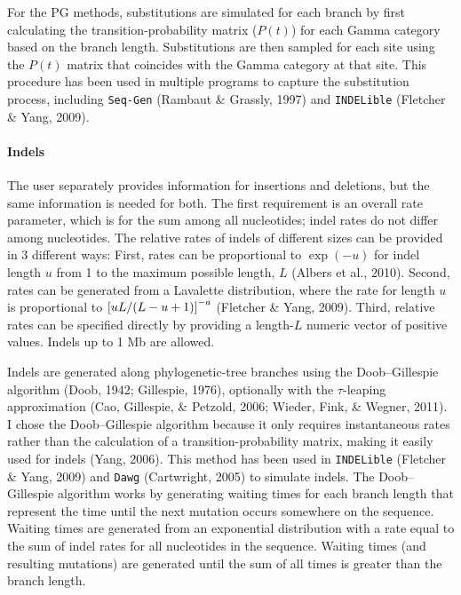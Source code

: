 \documentclass[12pt,]{article}
\let\oldparagraph\paragraph
\renewcommand{\paragraph}[1]{\oldparagraph{#1}\mbox{}}
\let\originalleft\left
\let\originalright\right
\renewcommand{\left}{\mathopen{}\mathclose\bgroup\originalleft}
\renewcommand{\right}{\aftergroup\egroup\originalright}
\begin{document}
For the PG methods, substitutions are simulated for each branch by first
calculating the transition-probability matrix (\(P(t)\)) for each Gamma category based on
the branch length.
Substitutions are then sampled for each site using the \(P(t)\) matrix that coincides with
the Gamma category at that site.
This procedure has been used in multiple programs to capture the substitution process,
including \texttt{Seq-Gen} (Rambaut \& Grassly, 1997) and \texttt{INDELible} (Fletcher \& Yang, 2009).

\hypertarget{indels}{%
\paragraph{Indels}\label{indels}}

The user separately provides information for insertions and deletions, but
the same information is needed for both.
The first requirement is an overall rate parameter, which is for the sum among all
nucleotides; indel rates do not differ among nucleotides.
The relative rates of indels of different sizes can be provided in 3 different ways:
First, rates can be proportional to \(\exp(-u)\) for indel length \(u\) from
1 to the maximum possible length, \(L\) (Albers et al., 2010).
Second, rates can be generated from a Lavalette distribution,
where the rate for length \(u\) is proportional to
\(\left[{u L / (L - u + 1)}\right]^{-a}\) (Fletcher \& Yang, 2009).
Third, relative rates can be specified directly by providing a length-\(L\)
numeric vector of positive values.
Indels up to 1 Mb are allowed.

Indels are generated along phylogenetic-tree branches using
the Doob--Gillespie algorithm (Doob, 1942; Gillespie, 1976), optionally
with the \(\tau\)-leaping approximation (Cao, Gillespie, \& Petzold, 2006; Wieder, Fink, \& Wegner, 2011).
I chose the Doob--Gillespie algorithm because it only requires instantaneous rates
rather than the calculation of a transition-probability matrix, making it easily used
for indels (Yang, 2006).
This method has been used in \texttt{INDELible} (Fletcher \& Yang, 2009) and \texttt{Dawg} (Cartwright, 2005)
to simulate indels.
The Doob--Gillespie algorithm works by generating waiting times for each branch
length that represent the time until the next mutation occurs somewhere on the sequence.
Waiting times are generated from an exponential distribution with a rate equal to the
sum of indel rates for all nucleotides in the sequence.
Waiting times (and resulting mutations) are generated until the sum of all times
is greater than the branch length.
\end{document}
